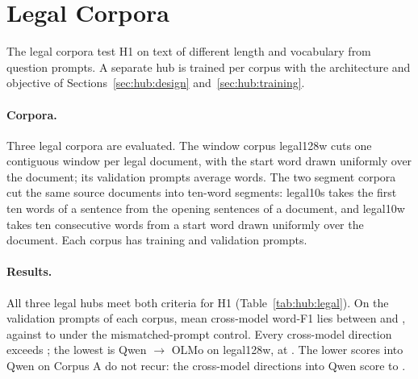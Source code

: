 \section{Legal Corpora}\label{sec:hub:legal}

The legal corpora test H1 on text of different length and vocabulary from question prompts.
A separate hub is trained per corpus with the architecture and objective of Sections~\ref{sec:hub:design} and~\ref{sec:hub:training}.

\paragraph{Corpora.} Three legal corpora are evaluated.
The window corpus legal128w cuts one contiguous window per legal document, with the start word drawn uniformly over the document; its validation prompts average  words. %
The two segment corpora cut the same source documents into ten-word segments: legal10s takes the first ten words of a sentence from the opening sentences of a document, and legal10w takes ten consecutive words from a start word drawn uniformly over the document. %
Each corpus has  training and  validation prompts. %

\paragraph{Results.} All three legal hubs meet both criteria for H1 (Table~\ref{tab:hub:legal}).
On the  validation prompts of each corpus, mean cross-model word-F1 lies between  and , against  to  under the mismatched-prompt control. %
Every cross-model direction exceeds ; the lowest is Qwen $\to$ OLMo on legal128w, at . %
The lower scores into Qwen on Corpus A do not recur: the cross-model directions into Qwen score  to . %

